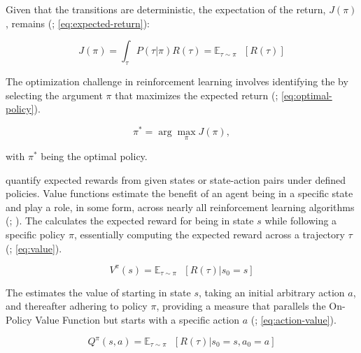     \noindent Given that the transitions are deterministic, the expectation of the return, $J(\pi)$, remains (\textcolor{deepblue}{\cite{Sutton1998}; \autoref{eq:expected-return}}):
    
    \begin{equation}
        J(\pi) = \int_{\tau} P(\tau | \pi) R(\tau) = \mathbb{E}_{\tau \sim \pi} \text{ }[R(\tau)]
        \label{eq:expected-return}
    \end{equation}
    
    \noindent The optimization challenge in reinforcement learning involves identifying the  by selecting the argument $\pi$ that maximizes the expected return (\textcolor{deepblue}{\cite{Sutton1998}; \autoref{eq:optimal-policy}}).
    
    \begin{equation}
        \pi^* = \arg \max_{\pi} J(\pi),
        \label{eq:optimal-policy}
    \end{equation}
    
    \noindent with $\pi^*$ being the optimal policy.
    
    \bigskip
    
    \noindent {} quantify expected rewards from given states or state-action pairs under defined policies. Value functions estimate the benefit of an agent being in a specific state and play a role, in some form, across nearly all reinforcement learning algorithms (\textcolor{deepblue}{\cite{SpinningUp2018}; \cite{AlMahamid_2021}}). The  calculates the expected reward for being in state $s$ while following a specific policy $\pi$, essentially computing the expected reward across a trajectory $\tau$ (\textcolor{deepblue}{\cite{Sutton1998}; \autoref{eq:value}}).
    
    \begin{equation}
        V^{\pi}(s) = \mathbb{E}_{\tau \sim \pi} \text{ }[R(\tau) | s_0 = s]
        \label{eq:value}
    \end{equation}
    
    \noindent The  estimates the value of starting in state $s$, taking an initial arbitrary action $a$, and thereafter adhering to policy $\pi$, providing a measure that parallels the On-Policy Value Function but starts with a specific action $a$ (\textcolor{deepblue}{\cite{Sutton1998}; \autoref{eq:action-value}}).
    
    \begin{equation}
        Q^{\pi}(s, a) = \mathbb{E}_{\tau \sim \pi} \text{ }[R(\tau) | s_0 = s, a_0 = a]
        \label{eq:action-value}
    \end{equation}
    
